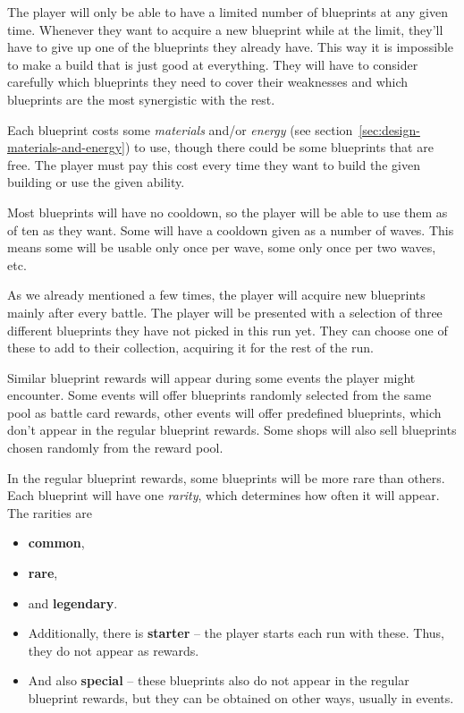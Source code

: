 The player will only be able to have a limited number of blueprints at any given time.
Whenever they want to acquire a new blueprint while at the limit, they'll have to give up one of the blueprints they already have.
This way it is impossible to make a build that is just good at everything.
They will have to consider carefully which blueprints they need to cover their weaknesses and which blueprints are the most synergistic with the rest.

Each blueprint costs some \emph{materials} and/or \emph{energy} (see section~\ref{sec:design-materials-and-energy}) to use, though there could be some blueprints that are free.
The player must pay this cost every time they want to build the given building or use the given ability.

Most blueprints will have no cooldown, so the player will be able to use them as of ten as they want.
Some will have a cooldown given as a number of waves.
This means some will be usable only once per wave, some only once per two waves, etc.

As we already mentioned a few times, the player will acquire new blueprints mainly after every battle.
The player will be presented with a selection of three different blueprints they have not picked in this run yet.
They can choose one of these to add to their collection, acquiring it for the rest of the run.
\begin{notindemo}
    Similar blueprint rewards will appear during some events the player might encounter.
    Some events will offer blueprints randomly selected from the same pool as battle card rewards, other events will offer predefined blueprints, which don't appear in the regular blueprint rewards.
    Some shops will also sell blueprints chosen randomly from the reward pool.
\end{notindemo}

In the regular blueprint rewards, some blueprints will be more rare than others.
Each blueprint will have one \emph{rarity}, which determines how often it will appear.
The rarities are
\begin{itemize}
    \item \textbf{common},
    \item \textbf{rare},
    \item and \textbf{legendary}.
    \item Additionally, there is \textbf{starter} -- the player starts each run with these. Thus, they do not appear as rewards.
    \item And also \textbf{special} -- these blueprints also do not appear in the regular blueprint rewards, but they can be obtained on other ways, usually in events.
\end{itemize}

